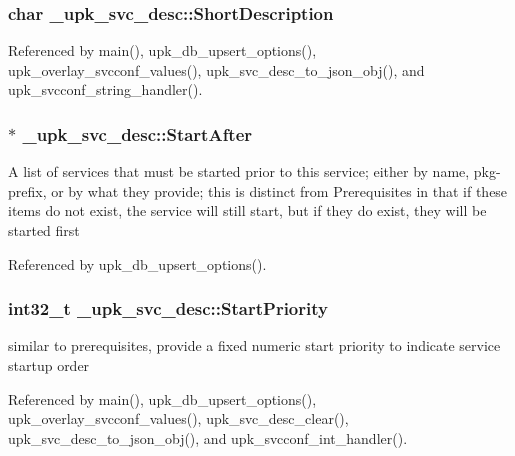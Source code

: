 \subsubsection[{ShortDescription}]{\setlength{\rightskip}{0pt plus 5cm}char {\bf \_\-upk\_\-svc\_\-desc::ShortDescription}}\label{struct__upk__svc__desc_a46361838fe014ea4b6f35f09d6767511}


Referenced by main(), upk\_\-db\_\-upsert\_\-options(), upk\_\-overlay\_\-svcconf\_\-values(), upk\_\-svc\_\-desc\_\-to\_\-json\_\-obj(), and upk\_\-svcconf\_\-string\_\-handler().

\subsubsection[{StartAfter}]{ $\ast$ {\bf \_\-upk\_\-svc\_\-desc::StartAfter}}\label{struct__upk__svc__desc_aec61cf2cc28a439589b70740e33e862a}
A list of services that must be started prior to this service; either by name, pkg-\/prefix, or by what they provide; this is distinct from Prerequisites in that if these items do not exist, the service will still start, but if they do exist, they will be started first 

Referenced by upk\_\-db\_\-upsert\_\-options().

\subsubsection[{StartPriority}]{\setlength{\rightskip}{0pt plus 5cm}int32\_\-t {\bf \_\-upk\_\-svc\_\-desc::StartPriority}}\label{struct__upk__svc__desc_a9eb636044a78073721e6f021067f5581}
similar to prerequisites, provide a fixed numeric start priority to indicate service startup order 

Referenced by main(), upk\_\-db\_\-upsert\_\-options(), upk\_\-overlay\_\-svcconf\_\-values(), upk\_\-svc\_\-desc\_\-clear(), upk\_\-svc\_\-desc\_\-to\_\-json\_\-obj(), and upk\_\-svcconf\_\-int\_\-handler().


